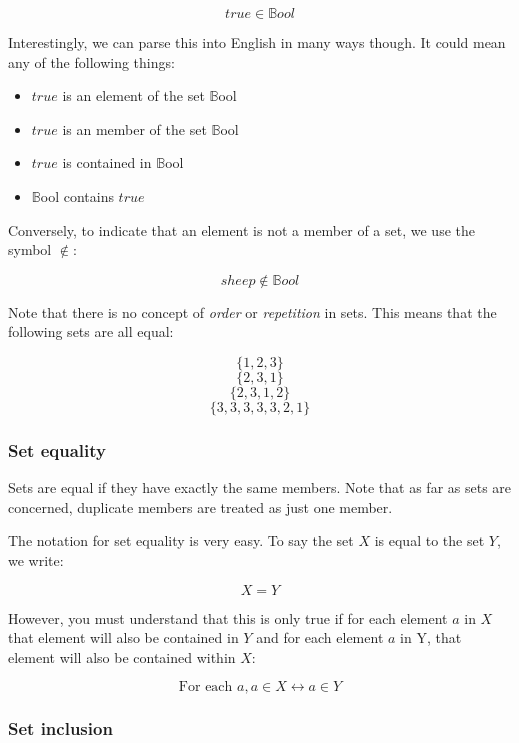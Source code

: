 \documentclass{article}
\begin{document}
\[
	true \in \mathbb{B}ool
\]

Interestingly, we can parse this into English in many ways though. It could mean any of the following things:

\begin{itemize}
	\item $true$ is an element of the set $\mathbb{B}$ool
	\item $true$ is an member of the set $\mathbb{B}$ool
	\item $true$ is contained in $\mathbb{B}$ool
	\item $\mathbb{B}$ool contains $true$
\end{itemize}

Conversely, to indicate that an element is not a member of a set, we use the symbol $\notin$:

\[
	sheep \not\in \mathbb{B}ool
\]

Note that there is no concept of {\it order} or {\it repetition} in sets. This means that the following sets are all equal:

\[
	\{1,2,3\}
\]
\[
	\{2,3,1\}
\]
\[
	\{2,3,1,2\}
\]
\[
	\{3,3,3,3,3,2,1\}
\]

\subsubsection{Set equality}

Sets are equal if they have exactly the same members. Note that as far as sets are concerned, duplicate members are treated as just one member.

The notation for set equality is very easy. To say the set $X$ is equal to the set $Y$, we write:

\[
	X = Y
\]

However, you must understand that this is only true if for each element $a$ in
$X$ that element will also be contained in $Y$ and for each element $a$ in Y,
that element will also be contained within $X$:


\[
	\textrm{For each }a, a \in X \leftrightarrow a \in Y
\]

\subsubsection{Set inclusion}
\end{document}
